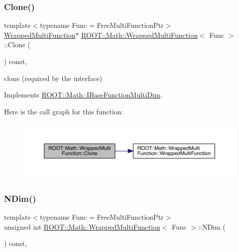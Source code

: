 \subsubsection{\texorpdfstring{Clone()}{Clone()}\hspace{0.1cm}{\footnotesize\ttfamily [2/2]}}
{\footnotesize\ttfamily template$<$typename Func  = Free\+Multi\+Function\+Ptr$>$ \\
\mbox{\hyperlink{classROOT_1_1Math_1_1WrappedMultiFunction}{Wrapped\+Multi\+Function}}$\ast$ \mbox{\hyperlink{classROOT_1_1Math_1_1WrappedMultiFunction}{R\+O\+O\+T\+::\+Math\+::\+Wrapped\+Multi\+Function}}$<$ Func $>$\+::Clone (\begin{DoxyParamCaption}{ }\end{DoxyParamCaption}) const\hspace{0.3cm}{\ttfamily [inline]}, {\ttfamily [virtual]}}



clone (required by the interface) 



Implements \mbox{\hyperlink{classROOT_1_1Math_1_1IBaseFunctionMultiDim_a57939204b1f525b43835b42e0635dd3b}{R\+O\+O\+T\+::\+Math\+::\+I\+Base\+Function\+Multi\+Dim}}.

Here is the call graph for this function\+:
\nopagebreak
\begin{figure}[H]
\begin{center}
\leavevmode
\includegraphics[width=350pt]{de/da4/classROOT_1_1Math_1_1WrappedMultiFunction_aafa24e359a607b4278f1bf238bdbc336_cgraph}
\end{center}
\end{figure}
\mbox{\label{classROOT_1_1Math_1_1WrappedMultiFunction_a99de9f7a6e26b03b1cdcf35d8c62d761}} 
\subsubsection{\texorpdfstring{NDim()}{NDim()}\hspace{0.1cm}{\footnotesize\ttfamily [1/2]}}
{\footnotesize\ttfamily template$<$typename Func  = Free\+Multi\+Function\+Ptr$>$ \\
unsigned int \mbox{\hyperlink{classROOT_1_1Math_1_1WrappedMultiFunction}{R\+O\+O\+T\+::\+Math\+::\+Wrapped\+Multi\+Function}}$<$ Func $>$\+::N\+Dim (\begin{DoxyParamCaption}{ }\end{DoxyParamCaption}) const\hspace{0.3cm}{\ttfamily [inline]}, {\ttfamily [virtual]}}

